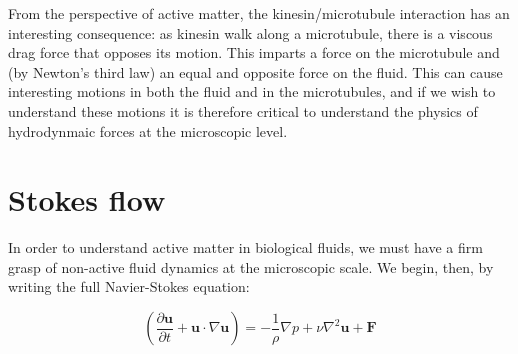 \documentclass[11pt]{ucthesis}
\begin{document}
From the perspective of active matter, the kinesin/microtubule interaction has an interesting consequence: as kinesin walk along a microtubule, there is a viscous drag force that opposes its motion. This imparts a force on the microtubule and (by Newton's third law) an equal and opposite force on the fluid. This can cause interesting motions in both the fluid and in the microtubules, and if we wish to understand these motions it is therefore critical to understand the physics of hydrodynmaic forces at the microscopic level.

\section{Stokes flow}

In order to understand active matter in biological fluids, we must have a firm grasp of non-active fluid dynamics at the microscopic scale. We begin, then, by writing the full Navier-Stokes equation:

\begin{equation}
\label{eq:navier}
\left(\frac{\partial \mathbf{u}}{\partial t} + \mathbf{u}\cdot\nabla\mathbf{u}\right) = -\frac1\rho\nabla p + \nu\nabla^2\mathbf{u} + \mathbf{F}
\end{equation}
\end{document}
